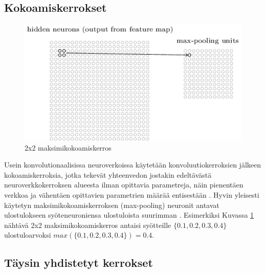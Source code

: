 \documentclass[finnish]{tktltiki2}
\theoremstyle{definition}
\theoremstyle{remark}
\begin{document}
    \subsection{Kokoamiskerrokset}
      \begin{figure}[h]
        \centering
        \includegraphics[scale=0.5]{max-pooling}
        \caption{2x2 maksimikokoamiskerros \cite{Nielsen-neural}}
        \label{pic:max-pooling}
      \end{figure}
      Usein konvolutionaalisissa neuroverkoissa käytetään konvoluutiokerroksien jälkeen kokoamiskerroksia, jotka tekevät yhteenvedon jostakin edeltävästä neuroverkkokerroksen alueesta ilman opittavia parametreja, näin pienentäen verkkoa ja vähentäen opittavien parametrien määrää entisestään \cite{Nielsen-neural}. Hyvin yleisesti käytetyn maksimikokoamiskerroksen (max-pooling) neuronit antavat ulostulokseen syöteneuroniensa ulostuloista suurimman \cite{KSHimagenet2012}. Esimerkiksi Kuvassa \ref{pic:max-pooling} nähtävä 2x2 maksimikokoamiskerros antaisi syötteille $\{0.1, 0.2, 0.3, 0.4\}$ ulostuloarvoksi $max(\{0.1, 0.2, 0.3, 0.4\}) = 0.4.$

    \subsection{Täysin yhdistetyt kerrokset}
\end{document}
